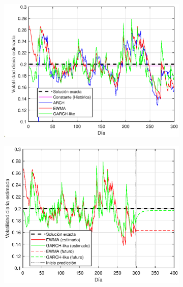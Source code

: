 \begin{figure}[H]
    \centering
    \begin{subfigure}[b]{0.45\linewidth}
        \includegraphics[width=\linewidth]{Imagenes/7_Volatilidad/Volatilidad.eps}
    \end{subfigure}
    \begin{subfigure}[b]{0.5\linewidth}
        \includegraphics[width=\linewidth]{Imagenes/7_Volatilidad/Volatilidad_Prediccion.eps}
    \end{subfigure}
    \begin{subfigure}[b]{0.45\linewidth}

\end{subfigure}
\end{figure}
